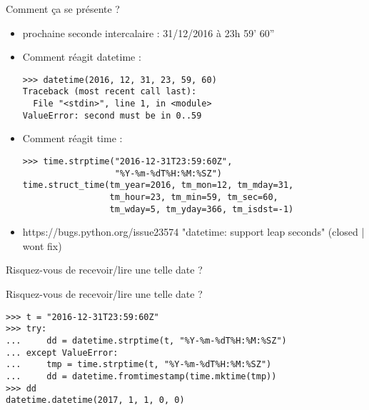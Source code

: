 \documentclass[]{beamer}
\begin{document}
\begin{frame}[fragile]{Comment ça se présente ?}
    \begin{itemize}
        \item prochaine seconde intercalaire : 31/12/2016 à 23h 59' 60''
        \item<2-> Comment réagit datetime :
            \footnotesize{\begin{verbatim}
>>> datetime(2016, 12, 31, 23, 59, 60)
Traceback (most recent call last):
  File "<stdin>", line 1, in <module>
ValueError: second must be in 0..59
            \end{verbatim}
        }
        \item<3-> Comment réagit time :
            \footnotesize{\begin{verbatim}
>>> time.strptime("2016-12-31T23:59:60Z", 
                  "%Y-%m-%dT%H:%M:%SZ")
time.struct_time(tm_year=2016, tm_mon=12, tm_mday=31, 
                 tm_hour=23, tm_min=59, tm_sec=60, 
                 tm_wday=5, tm_yday=366, tm_isdst=-1)
            \end{verbatim}
        }
        \item<4-> https://bugs.python.org/issue23574 "datetime: support leap seconds"
            (closed | wont fix)
    \end{itemize}
\end{frame}

\begin{frame}[fragile]{Risquez-vous de recevoir/lire une telle date ?}
\end{frame}

\begin{frame}[fragile]{Risquez-vous de recevoir/lire une telle date ?}
\footnotesize{\begin{verbatim}
>>> t = "2016-12-31T23:59:60Z"
>>> try:
...     dd = datetime.strptime(t, "%Y-%m-%dT%H:%M:%SZ")
... except ValueError:
...     tmp = time.strptime(t, "%Y-%m-%dT%H:%M:%SZ")
...     dd = datetime.fromtimestamp(time.mktime(tmp))
>>> dd
datetime.datetime(2017, 1, 1, 0, 0)

\end{verbatim}
}
\end{frame}
\end{document}
